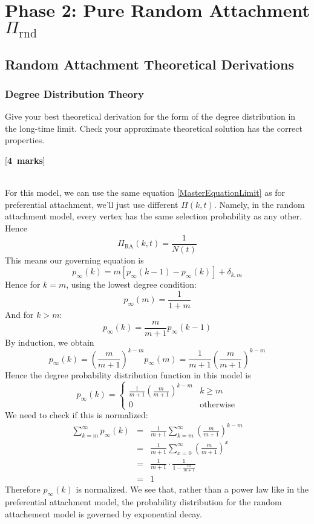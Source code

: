\documentclass[a4paper,12pt]{article}
\newcounter{nmarks}
\newcommand{\qmarks}[1]{\addtocounter{nmarks}{#1} }
\renewcommand{\qmarks}[1]{\addtocounter{nmarks}{#1} \hspace*{\fill} [\textbf{#1~marks}]}
\begin{document}
\section{Phase 2: Pure Random Attachment $\Pi_\mathrm{rnd}$}



\subsection{Random Attachment Theoretical Derivations}


\subsubsection{Degree Distribution Theory}
Give your best theoretical derivation for the form of the degree distribution in the long-time limit. Check your approximate theoretical solution has the correct properties. \qmarks{4}

\hfill\\
For this model, we can use the same equation \ref{MasterEquationLimit} as for preferential attachment, we'll just use different $\Pi(k,t)$. Namely, in the random attachment model, every vertex has the same selection probability as any other. Hence
$$\Pi_{\mathrm{RA}}(k,t)=\frac{1}{N(t)}$$
This means our governing equation is
\begin{equation} \label{MasterEquationLimitRA}
p_\infty(k)= m\left[ p_\infty(k-1)-p_\infty(k) \right] + \delta_{k,m}
\end{equation}
Hence for $k=m$, using the lowest degree condition:
$$p_\infty(m)=\frac{1}{1+m}$$
And for $k>m$:
$$p_\infty(k)=\frac{m}{m+1}p_\infty(k-1)$$
By induction, we obtain
$$p_\infty(k)=\left(\frac{m}{m+1}\right)^{k-m}p_\infty(m)=\frac{1}{m+1}\left(\frac{m}{m+1}\right)^{k-m}$$
Hence the degree probability distribution function in this model is
\begin{equation} \label{RAprob}
p_\infty(k)=\begin{cases}
\frac{1}{m+1}\left(\frac{m}{m+1}\right)^{k-m} & k\geq m\\
0 & \mathrm{otherwise}
\end{cases}
\end{equation}
We need to check if this is normalized:
\begin{eqnarray*}
\sum_{k=m}^\infty p_\infty(k)&=&\frac{1}{m+1} \sum_{k=m}^\infty \left(\frac{m}{m+1}\right)^{k-m}\\
&=&\frac{1}{m+1} \sum_{x=0}^\infty \left(\frac{m}{m+1}\right)^x\\
&=&\frac{1}{m+1} \cdot \frac{1}{1-\frac{m}{m+1}}\\
&=& 1
\end{eqnarray*}
Therefore $p_\infty(k)$ is normalized. We see that, rather than a power law like in the preferential attachment model, the probability distribution for the random attachement model is governed by exponential decay.
\end{document}
